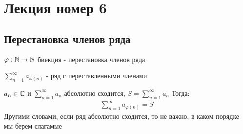 \section{Лекция номер 6}

\subsection{Перестановка членов ряда}

\newcommand{\sumn}{\sum \limits_{n=1}^\infty}
\newcommand{\sumk}{\sum \limits_{k=1}^n}
\newcommand{\prodn}{\prod \limits_{n=1}^\infty}
\newcommand{\prodk}{\prod \limits_{k=1}^n}

\begin{conj}

    $\varphi: \mathbb{N} \to \mathbb{N}$ биекция - перестановка членов ряда

    $\sum \limits_{n=1}^\infty a_{\varphi(n)}$
     - ряд с переставленными членами
\end{conj}

\begin{theorem}
    $a_n \in \mathbb{C}$ и $\sumn a_n$ абсолютно сходится, $S = \sumn a_n$
    Тогда:
    \begin{gather*}
        \sumn a_{\varphi(n)} = S
    \end{gather*}
    Другими словами, если ряд абсолютно сходится, то не важно, в каком порядке мы берем слагамые
\end{theorem}

